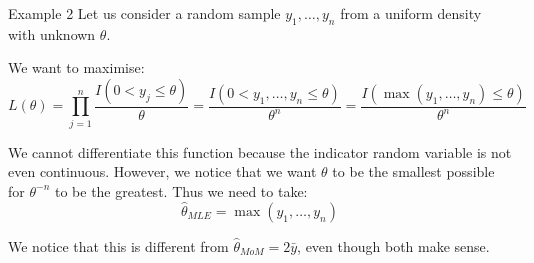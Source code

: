 \documentclass[a4paper]{article}
\begin{document}
\begin{parag}{Example 2}
    Let us consider a random sample $y_1, \ldots, y_n$ from a uniform density with unknown $\theta$.

    We want to maximise: 
    \[L\left(\theta\right) = \prod_{j=1}^{n} \frac{I\left(0 < y_j \leq \theta\right)}{\theta} = \frac{I\left(0 < y_1, \ldots, y_n \leq \theta\right)}{\theta^n} = \frac{I\left(\max\left(y_1, \ldots, y_n\right) \leq \theta\right)}{\theta^n}\]
    
    We cannot differentiate this function because the indicator random variable is not even continuous. However, we notice that we want $\theta$ to be the smallest possible for $\theta^{-n}$ to be the greatest. Thus we need to take: 
    \[\hat{\theta}_{MLE} = \max\left(y_1, \ldots, y_n\right)\]
    
    We notice that this is different from $\hat{\theta}_{MoM} = 2 \bar{y}$, even though both make sense.
\end{parag}
\end{document}
